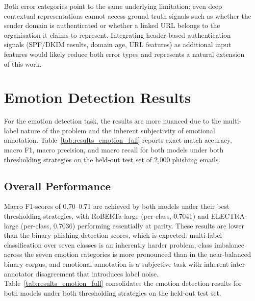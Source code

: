 Both error categories point to the same underlying limitation: even deep contextual representations cannot access ground truth signals such as whether the sender domain is authenticated or whether a linked URL belongs to the organisation it claims to represent. Integrating header-based authentication signals (SPF/DKIM results, domain age, URL features) as additional input features would likely reduce both error types and represents a natural extension of this work.

\section{Emotion Detection Results}
\label{sec:results_emotion}

For the emotion detection task, the results are more nuanced due to the multi-label nature of the problem and the inherent subjectivity of emotional annotation. Table~\ref{tab:results_emotion_full} reports exact match accuracy, macro F1, macro precision, and macro recall for both models under both thresholding strategies on the held-out test set of 2,000 phishing emails.

\subsection{Overall Performance}

Macro F1-scores of 0.70--0.71 are achieved by both models under their best thresholding strategies, with \acs{RoBERTa}-large (per-class, 0.7041) and \acs{ELECTRA}-large (per-class, 0.7036) performing essentially at parity. These results are lower than the binary phishing detection scores, which is expected: multi-label classification over seven classes is an inherently harder problem, class imbalance across the seven emotion categories is more pronounced than in the near-balanced binary corpus, and emotional annotation is a subjective task with inherent inter-annotator disagreement that introduces label noise. Table~\ref{tab:results_emotion_full} consolidates the emotion detection results for both models under both thresholding strategies on the held-out test set.

